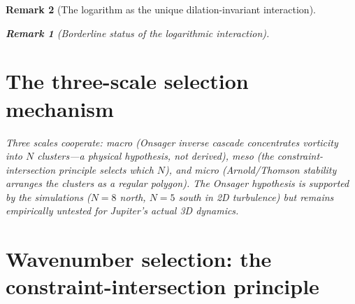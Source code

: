 \documentclass[12pt, a4paper]{article}
\newtheorem{remark}{Remark}[section]
\numberwithin{equation}{section}
\begin{document}
\begin{remark}[The logarithm as the unique dilation-invariant interaction]
\begin{remark}[Borderline status of the logarithmic interaction]
\section{The three-scale selection mechanism}
\label{sec:three-scale}
\label{sec:two-scale}
\label{sec:extensions}

Three scales cooperate:
\emph{macro} (Onsager inverse cascade concentrates vorticity into
$N$ clusters---a physical hypothesis, not derived),
\emph{meso} (the constraint-intersection principle selects which $N$),
and \emph{micro} (Arnold/Thomson stability arranges the clusters as
a regular polygon).
The Onsager hypothesis is supported by the \citet{Siegelman2022}
simulations ($N = 8$ north, $N = 5$ south in 2D turbulence)
but remains empirically untested for Jupiter's actual 3D dynamics.


\section{Wavenumber selection: the constraint-intersection principle}
\label{sec:constraint-intersection}


\end{remark}
\end{remark}
\end{document}

